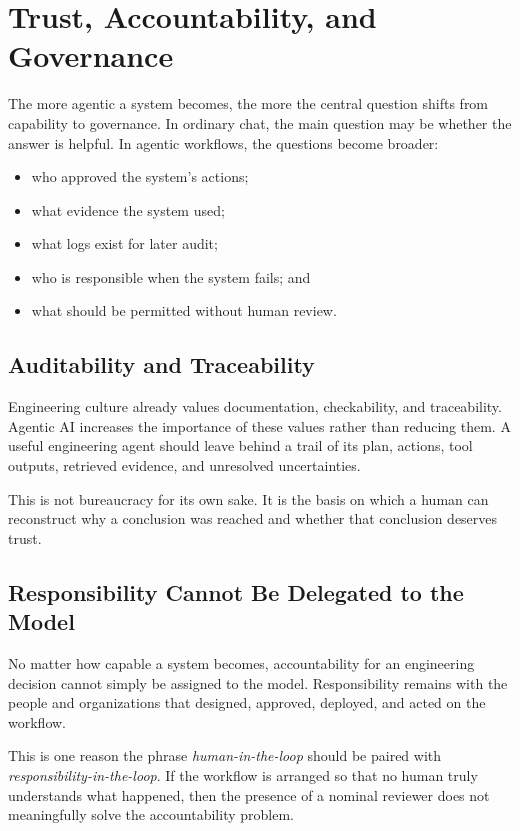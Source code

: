 \documentclass[12pt]{article}
\begin{document}
\section{Trust, Accountability, and Governance}

The more agentic a system becomes, the more the central question shifts from capability to governance. In ordinary chat, the main question may be whether the answer is helpful. In agentic workflows, the questions become broader:
\begin{itemize}
    \item who approved the system's actions;
    \item what evidence the system used;
    \item what logs exist for later audit;
    \item who is responsible when the system fails; and
    \item what should be permitted without human review.
\end{itemize}

\subsection{Auditability and Traceability}

Engineering culture already values documentation, checkability, and traceability. Agentic AI increases the importance of these values rather than reducing them. A useful engineering agent should leave behind a trail of its plan, actions, tool outputs, retrieved evidence, and unresolved uncertainties.

This is not bureaucracy for its own sake. It is the basis on which a human can reconstruct why a conclusion was reached and whether that conclusion deserves trust.

\subsection{Responsibility Cannot Be Delegated to the Model}

No matter how capable a system becomes, accountability for an engineering decision cannot simply be assigned to the model. Responsibility remains with the people and organizations that designed, approved, deployed, and acted on the workflow.

This is one reason the phrase \emph{human-in-the-loop} should be paired with \emph{responsibility-in-the-loop}. If the workflow is arranged so that no human truly understands what happened, then the presence of a nominal reviewer does not meaningfully solve the accountability problem.
\end{document}
